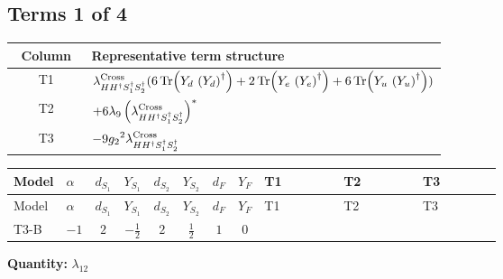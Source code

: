 \documentclass[8pt]{article}
\begin{document}
\begin{landscape}
\subsection*{Terms 1 of 4}
\begin{center}
\begin{tabular}{@{}c >{\raggedright\arraybackslash}p{0.82\linewidth}@{}}
\toprule
Column & Representative term structure \\
\midrule
T1 & \(\displaystyle {\lambda_{H H^\dagger S_1^\dagger S_2^\dagger}^{\rm Cross}} (6 \operatorname{Tr}\!\left({Y_d}\,\left({Y_d}\right)^{\dagger}\right)+2 \operatorname{Tr}\!\left({Y_e}\,\left({Y_e}\right)^{\dagger}\right)+6 \operatorname{Tr}\!\left({Y_u}\,\left({Y_u}\right)^{\dagger}\right))\) \\
\midrule
T2 & \(\displaystyle +6 {\lambda_{9}} \left({\lambda_{H H^\dagger S_1^\dagger S_2^\dagger}^{\rm Cross}}\right)^{*}\) \\
\midrule
T3 & \(\displaystyle -9 {g_2}^2 {\lambda_{H H^\dagger S_1^\dagger S_2^\dagger}^{\rm Cross}}\) \\
\midrule
\bottomrule
\end{tabular}
\end{center}
\smallskip
\tiny
\begin{longtable}{@{}llcccccc >{\raggedright\arraybackslash}p{0.21\linewidth} >{\raggedright\arraybackslash}p{0.21\linewidth} >{\raggedright\arraybackslash}p{0.21\linewidth}@{}}
\toprule
Model & $\alpha$ & $d_{S_1}$ & $Y_{S_1}$ & $d_{S_2}$ & $Y_{S_2}$ & $d_F$ & $Y_F$ & T1 & T2 & T3 \\
\midrule
\endfirsthead
\toprule
Model & $\alpha$ & $d_{S_1}$ & $Y_{S_1}$ & $d_{S_2}$ & $Y_{S_2}$ & $d_F$ & $Y_F$ & T1 & T2 & T3 \\
\midrule
\endhead
T3-B & $-1$ & $2$ & $-\frac{1}{2}$ & $2$ & $\frac{1}{2}$ & $1$ & $0$ & \scriptsize\adjustbox{max width=\linewidth}{$\begin{gathered} {\lambda_{H H^\dagger S_1^\dagger S_2^\dagger}^{\rm Cross}} (6 \operatorname{Tr}\!\left({Y_d}\,\left({Y_d}\right)^{\dagger}\right)+2 \operatorname{Tr}\!\left({Y_e}\,\left({Y_e}\right)^{\dagger}\right)+6 \operatorname{Tr}\!\left({Y_u}\,\left({Y_u}\right)^{\dagger}\right))\end{gathered}$} & \scriptsize\adjustbox{max width=\linewidth}{$\begin{gathered} +6 {\lambda_{9}} \left({\lambda_{H H^\dagger S_1^\dagger S_2^\dagger}^{\rm Cross}}\right)^{*}\end{gathered}$} & \scriptsize\adjustbox{max width=\linewidth}{$\begin{gathered} -9 {g_2}^2 {\lambda_{H H^\dagger S_1^\dagger S_2^\dagger}^{\rm Cross}}\end{gathered}$} \\
\midrule
\bottomrule
\end{longtable}
\clearpage
\noindent\textbf{Quantity: }$\lambda_{12}$\par\smallskip

\end{landscape}
\end{document}
